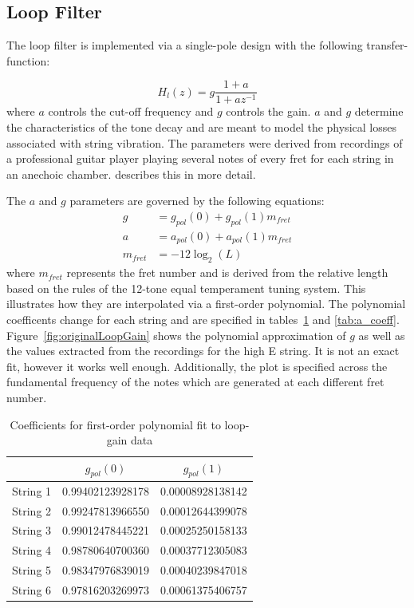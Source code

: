 \documentclass[main.tex]{subfiles}
\begin{document}
\subsection{Loop Filter}
The loop filter is implemented via a single-pole design with the following transfer-function:

\begin{equation}
    H_l(z) = g \frac{1 + a}{1 + a z^{-1}}
    \label{eqn:one-pole}
\end{equation}
where $a$ controls the cut-off frequency and $g$ controls the gain. $a$ and $g$ determine the characteristics of the tone decay and are meant to model the physical losses associated with string vibration. The parameters were derived from recordings of a professional guitar player playing several notes of every fret for each string in an anechoic chamber.  describes this in more detail.

The $a$ and $g$ parameters are governed by the following equations:
\begin{align}
    g &= g_{pol}(0) + g_{pol}(1)m_{fret}\\
    a &= a_{pol}(0) + a_{pol}(1)m_{fret}\\
    \label{eq:fretNumber}
    m_{fret} &= -12\log_2(L)
\end{align}
where $m_{fret}$ represents the fret number and is derived from the relative length based on the rules of the 12-tone equal temperament tuning system. This illustrates how they are interpolated via a first-order polynomial. The polynomial coefficents change for each string and are specified in tables~\ref{tab:g_coeff} and \ref{tab:a_coeff}. Figure~\ref{fig:originalLoopGain} shows the polynomial approximation of $g$ as well as the values extracted from the recordings for the high E string. It is not an exact fit, however it works well enough. Additionally, the plot is specified across the fundamental frequency of the notes which are generated at each different fret number.

\begin{table}[h]
\centering
\begin{tabular}{|c| c| c|} 
 \hline
     & $g_{pol}(0)$ & $g_{pol}(1)$ \\ [0.5ex] 
 \hline
 String 1 & 0.99402123928178  & 0.00008928138142 \\ 
 String 2 & 0.99247813966550  & 0.00012644399078 \\ 
 String 3 & 0.99012478445221  & 0.00025250158133 \\ 
 String 4 & 0.98780640700360  & 0.00037712305083 \\ 
 String 5 & 0.98347976839019  & 0.00040239847018 \\ 
 String 6 & 0.97816203269973  & 0.00061375406757 \\ 
 \hline
\end{tabular}
\caption{Coefficients for first-order polynomial fit to loop-gain data }
\label{tab:g_coeff}
\end{table}
\end{document}
